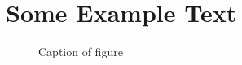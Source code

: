 \section{Some Example Text}
\lipsum[3]

\begin{figure}
\centering
\setlength\figureheight{5cm}
\setlength{}

\caption[Caption for list of figures]{Caption of figure}
\label{fig:example}
\end{figure}

\lipsum[6-10]
